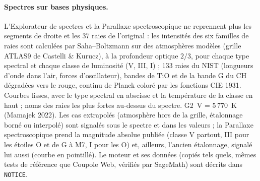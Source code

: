 \paragraph{Spectres sur bases physiques.} L'Explorateur de spectres et la Parallaxe spectroscopique ne reprennent plus
les segments de droite et les 37 raies de l'original : les intensités des six familles de raies sont calculées par
Saha–Boltzmann sur des atmosphères modèles (grille ATLAS9 de Castelli \& Kurucz), à la profondeur optique $2/3$, pour
chaque type spectral et chaque classe de luminosité (V, III, I) ; 133 raies du NIST (longueurs d'onde dans l'air, forces
d'oscillateur), bandes de TiO et de la bande G du CH dégradées vers le rouge, continu de Planck coloré par les fonctions
CIE 1931. Courbes lisses, avec le type spectral en abscisse et la température de la classe en haut ; noms des raies les
plus fortes au-dessus du spectre. G2~V = 5\,770~K (Mamajek 2022). Les cas extrapolés (atmosphère hors de la grille,
étalonnage borné ou interpolé) sont signalés sous le spectre et dans les valeurs ; la Parallaxe spectroscopique prend
la magnitude absolue publiée (classe V partout, III pour les étoiles O et de G à M7, I pour les O) et, ailleurs,
l'ancien étalonnage, signalé lui aussi (courbe en pointillé). Le moteur et ses données (copiés tels quels, mêmes tests
de référence que Coupole Web, vérifiés par SageMath) sont décrits dans \texttt{NOTICE}.

